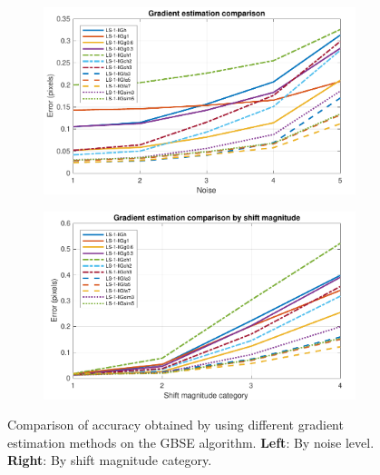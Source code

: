 \begin{figure}[htpb]
\centering
\begin{subfigure}{.5\textwidth}
\includegraphics[width=\textwidth]{img/gradientEvaluation}
\end{subfigure}%
\begin{subfigure}{.5\textwidth}
\includegraphics[width=\textwidth]{img/gradientEvaluationByShift}
\end{subfigure}
\caption{Comparison of accuracy obtained by using different gradient estimation methods on the GBSE algorithm. \textbf{Left}: By noise level. \textbf{Right}: By shift magnitude category.}
\label{fig:gradEvaluation}
\end{figure}

